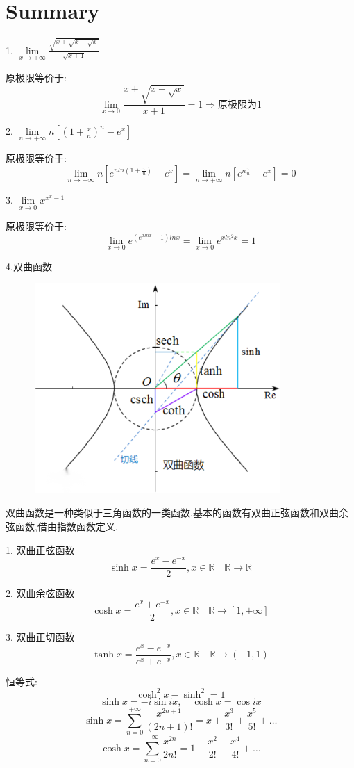 \chapter{Summary}
1. $\lim\limits_{x\rightarrow +\infty}\frac{\sqrt{x+\sqrt{x+\sqrt{x}}}}{\sqrt{x+1}}$
\begin{solution}
	
	原极限等价于:  
	$$\lim\limits_{x\rightarrow 0}\frac{x+\sqrt{x+\sqrt{x}}}{x+1}=1\Rightarrow \text{原极限为}1$$
\end{solution}
2. $\lim\limits_{n\rightarrow +\infty}n[(1+\frac{x}{n})^n-e^x]$
\begin{solution}
	
	原极限等价于:  
	$$\lim\limits_{n\rightarrow +\infty}n[e^{nln(1+\frac{x}{n})}-e^x]=\lim\limits_{n\rightarrow +\infty}n[e^{n\frac{x}{n}}-e^x]=0$$
\end{solution}
3. $\lim\limits_{x\rightarrow 0}x^{x^{x}-1}$
\begin{solution}
	
	原极限等价于:  
	$$\lim\limits_{x\rightarrow 0}e^{(e^{xlnx}-1)ln x}=\lim\limits_{x\rightarrow 0}e^{xln^2 x}=1$$
\end{solution}
4.双曲函数
\begin{figure}[htbp]
	\centering
	\includegraphics[width=9.5cm,height=8cm]{"figure/Summary/双曲函数.png"}
\end{figure} 
\begin{definition}\label{def: 双曲函数}
	双曲函数是一种类似于三角函数的一类函数,基本的函数有双曲正弦函数和双曲余弦函数,借由指数函数定义.
	
	1. 双曲正弦函数 
	$$\sinh x=\frac{e^{x}-e^{-x}}{2},x\in \mathbb{R}\quad \mathbb{R}\rightarrow \mathbb{R}$$
	
	2. 双曲余弦函数
	$$\cosh x=\frac{e^{x}+e^{-x}}{2},x\in \mathbb{R}\quad \mathbb{R}\rightarrow [1,+\infty]$$
	
	3. 双曲正切函数
	$$\tanh x=\frac{e^{x}-e^{-x}}{e^{x}+e^{-x}},x\in \mathbb{R}\quad \mathbb{R}\rightarrow (-1,1)$$
	
	恒等式:  
	$$\cosh^2 x-\sinh^2=1$$
	$$\sinh x=-i\sin ix,\quad \cosh x=\cos ix$$
	$$\sinh x=\sum\limits_{n=0}^{+\infty}\frac{x^{2n+1}}{(2n+1)!}=x+\frac{x^3}{3!}+\frac{x^5}{5!}+\dots$$
	$$\cosh x=\sum\limits_{n=0}^{+\infty}\frac{x^{2n}}{2n!}=1+\frac{x^2}{2!}+\frac{x^4}{4!}+\dots$$
\end{definition}
